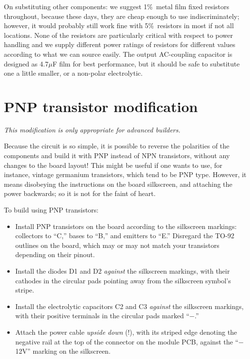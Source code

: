 On substituting other components:  we suggest 1\%\ metal film fixed
resistors throughout, because these days, they are cheap enough to use
indiscriminately; however, it would probably still work fine with 5\%\ 
resistors in most if not all locations.  None of the resistors are
particularly critical with respect to power handling and we supply different
power ratings of resistors for different values according to what we can
source easily.  The output AC-coupling capacitor is designed as 4.7$\mu$F
film for best performance, but it should be safe to substitute one a little
smaller, or a non-polar electrolytic.

\section{PNP transistor modification}

\emph{This modification is only appropriate for advanced builders.}

Because the circuit is so simple, it is possible to reverse the polarities
of the components and build it with PNP instead of NPN transistors,
without any changes to the board layout!  This might be useful if one wants
to use, for instance, vintage germanium transistors, which tend to be PNP
type.  However, it means disobeying the instructions on the board
silkscreen, and attaching the power backwards; so it is not for the faint of
heart.

To build using PNP transistors:

\begin{itemize}
  \item Install PNP transistors on the board according to the silkscreen
  markings:  collectors to ``C,'' bases to ``B,'' and emitters to ``E.''
  Disregard the TO-92 outlines on the board, which may or may not match your
  transistors depending on their pinout.
  \item Install the diodes D1 and D2 \emph{against} the silkscreen markings,
  with their cathodes in the circular pads pointing away from the silkscreen
  symbol's stripe.
  \item Install the electrolytic capacitors C2 and C3 \emph{against} the
  silkscreen markings, with their positive terminals in the circular pads
  marked ``$-$.''
  \item Attach the power cable \emph{upside down} (!), with its striped edge
  denoting the negative rail at the top of the connector on the module PCB,
  against the ``$-$12V'' marking on the silkscreen.
\end{itemize}

